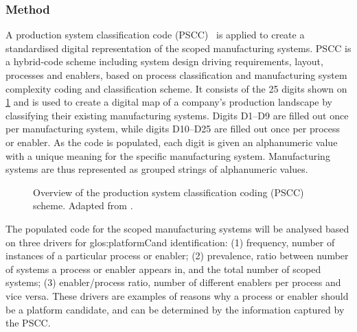 \subsubsection*{Method}
A production system classification code (PSCC)~\parencite{SorensenClsfCoding} is applied to create a standardised digital representation of the scoped manufacturing systems.
PSCC is a hybrid-code scheme including system design driving requirements, layout, processes and enablers, based on  process classification and  manufacturing system complexity coding and classification scheme.
It consists of the 25 digits shown on \cref{fig:PSCC_APMS2019} and is used to create a digital map of a company's production landscape by classifying their existing manufacturing systems.
Digits D1--D9 are filled out once per manufacturing system, while digits D10--D25 are filled out once per process or enabler.
As the code is populated, each digit is given an alphanumeric value with a unique meaning for the specific manufacturing system.
Manufacturing systems are thus represented as grouped strings of alphanumeric values.
\begin{figure}[tb]
  \centering
  \caption[Overview of the production system classification code (PSCC).]
  {Overview of the production system classification coding (PSCC) scheme.
  Adapted from \parencite{SorensenAPMS2019}.}\label{fig:PSCC_APMS2019}
\end{figure}

The populated code for the scoped manufacturing systems will be analysed based on three drivers for \gls{glos:platformCand} identification: (1) frequency, number of instances of a particular process or enabler; (2) prevalence, ratio between number of systems a process or enabler appears in, and the total number of scoped systems; (3) enabler/process ratio, number of different enablers per process and vice versa.
These drivers are examples of reasons why a process or enabler should be a platform candidate, and can be determined by the information captured by the PSCC.

